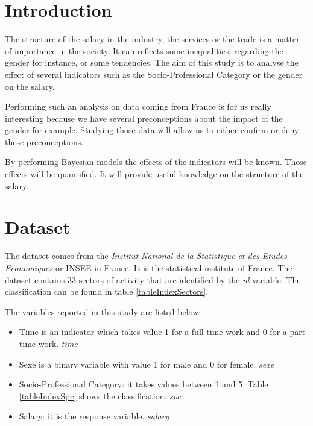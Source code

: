 \documentclass[]{article}
\begin{document}
\section{Introduction}\label{introduction}

The structure of the salary in the industry, the services or the trade
is a matter of importance in the society. It can reflects some
inequalities, regarding the gender for instance, or some tendencies. The
aim of this study is to analyse the effect of several indicators such as
the Socio-Professional Category or the gender on the salary.

Performing such an analysis on data coming from France is for us really
interesting because we have several preconceptions about the impact of
the gender for example. Studying those data will allow us to either
confirm or deny these preconceptions.

By performing Bayesian models the effects of the indicators will be
known. Those effects will be quantified. It will provide useful
knowledge on the structure of the salary.

\section{Dataset}\label{dataset}

\label{dataset}

The dataset comes from the \emph{Institut National de la Statistique et
des Etudes Economiques} or INSEE in France. It is the statistical
institute of France. The dataset contains 33 sectors of activity that
are identified by the \emph{id} variable. The classification can be
found in table \ref{tableIndexSectors}.

The variables reported in this study are listed below:

\begin{itemize}
\itemsep1pt\parskip0pt
\item
  Time is an indicator which takes value 1 for a full-time work and 0
  for a part-time work. \emph{time}
\item
  Sexe is a binary variable with value 1 for male and 0 for female.
  \emph{sexe}
\item
  Socio-Professional Category: it takes values between 1 and 5. Table
  \ref{tableIndexSpc} shows the classification. \emph{spc}
\item
  Salary: it is the response variable. \emph{salary}
\end{itemize}
\end{document}
